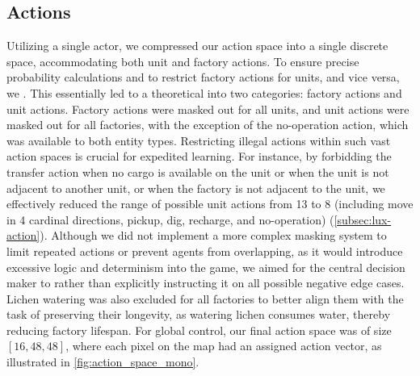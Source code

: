 \subsection{Actions}
\label{subsec:mono-actions}

\noindent Utilizing a single actor, we compressed our action space into a single discrete space, accommodating both unit and factory actions. To ensure precise probability calculations and to restrict factory actions for units, and vice versa, we . This essentially led to a theoretical  into two categories: factory actions and unit actions. Factory actions were masked out for all units, and unit actions were masked out for all factories, with the exception of the no-operation action, which was available to both entity types. Restricting illegal actions within such vast action spaces is crucial for expedited learning. For instance, by forbidding the transfer action when no cargo is available on the unit or when the unit is not adjacent to another unit, or when the factory is not adjacent to the unit, we effectively reduced the range of possible unit actions from 13 to 8 (including move in 4 cardinal directions, pickup, dig, recharge, and no-operation) (\autoref{subsec:lux-action}). Although we did not implement a more complex masking system to limit repeated actions or prevent agents from overlapping, as it would introduce excessive logic and determinism into the game, we aimed for the central decision maker to  rather than explicitly instructing it on all possible negative edge cases. Lichen watering was also excluded for all factories to better align them with the task of preserving their longevity, as watering lichen consumes water, thereby reducing factory lifespan. For global control, our final action space was of size $[16,48,48]$, where each pixel on the map had an assigned action vector, as illustrated in \autoref{fig:action_space_mono}.


